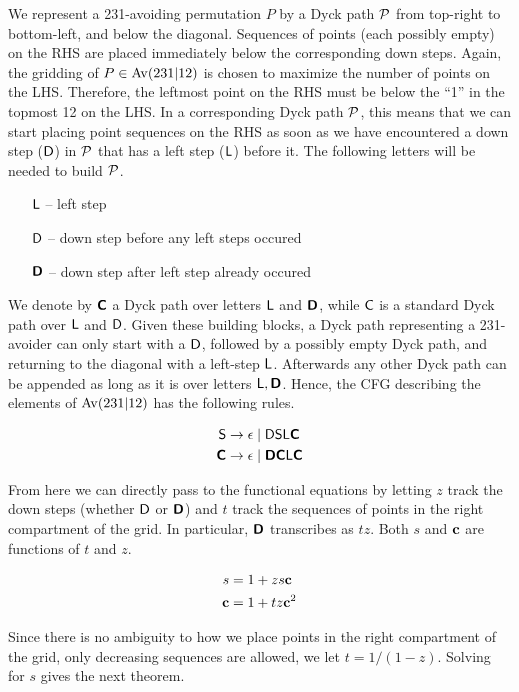 We represent a 231-avoiding permutation $P$ by a Dyck path $\P$ from top-right to bottom-left, and below the diagonal. Sequences of points (each possibly empty) on the RHS are placed immediately below the corresponding down steps. Again, the gridding of $P \in \Av(231|12)$ is chosen to maximize the number of points on the LHS. Therefore, the leftmost point on the RHS must be below the ``1'' in the topmost 12 on the LHS. In a corresponding Dyck path $\P$, this means that we can start placing point sequences on the RHS as soon as we have encountered a down step ($\fD$) in $\P$ that has a left step ($\fL$) before it. The following letters will be needed to build $\P$. 
\begin{enumerate}
\item[$\fL$ --] left step
\item[$\fD$ --] down step before any left steps occured
\item[$\bD$ --] down step after left step already occured
\end{enumerate}

We denote by $\bC$ a Dyck path over letters $\fL$ and $\bD$, while $\fC$ is a standard Dyck path over $\fL$ and $\fD$. Given these building blocks, a Dyck path representing a 231-avoider can only start with a $\fD$, followed by a possibly empty Dyck path, and returning to the diagonal with a left-step $\fL$. Afterwards any other Dyck path can be appended as long as it is over letters $\fL, \bD$. Hence, the CFG describing the elements of $\Av(231|12)$ has the following rules.

\begin{align*}
\fS &\to \epsilon \mid \fD\fS\fL\bC\\
\bC &\to \epsilon \mid \bD\bC\fL\bC
\end{align*}

From here we can directly pass to the functional equations by letting $z$ track the down steps (whether $\fD$ or $\bD$) and $t$ track the sequences of points in the right compartment of the grid. In particular, $\bD$ transcribes as $tz$. Both $s$ and $\bc$ are functions of $t$ and $z$.

\begin{align*}
s &= 1 + zs\bc\\
\bc &= 1 + tz\bc^2
\end{align*}

Since there is no ambiguity to how we place points in the right compartment of the grid, only decreasing sequences are allowed, we let $t = 1/(1-z)$. Solving for $s$ gives the next theorem. 

